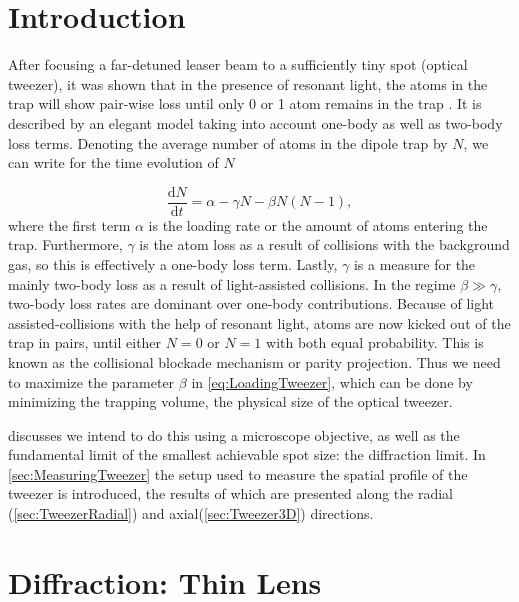 \section{Introduction}\label{sec:LoadingAtoms}

After focusing a far-detuned leaser beam to a sufficiently tiny spot (optical tweezer), it was shown that in the presence of resonant light, the atoms in the trap will show pair-wise loss until only 0 or 1 atom remains in the trap \cite{Schlosser2001}.
It is described by an elegant model taking into account one-body as well as two-body loss terms. 
Denoting the average number of atoms in the dipole trap by $N$, we can write for the time evolution of $N$ \cite{Schlosser2002} 

\begin{equation}\label{eq:LoadingTweezer}
	\frac{\text{d}N}{\text{d}t} = \alpha - \gamma N - \beta N(N-1),
\end{equation}
where the first term $\alpha$ is the loading rate or the amount of atoms entering the trap.
Furthermore, $\gamma$ is the atom loss as a result of collisions with the background gas, so this is effectively a one-body loss term.
Lastly, $\gamma$ is a measure for the mainly two-body loss as a result of light-assisted collisions.
In the regime $\beta \gg \gamma$, two-body loss rates are dominant over one-body contributions. 
Because of light assisted-collisions with the help of resonant light, atoms are now kicked out of the trap in pairs, until either $N=0$ or $N=1$ with both equal probability. 
This is known as the collisional blockade mechanism \cite{Schlosser2001} or parity projection.
Thus we need to maximize the parameter $\beta$ in \cref{eq:LoadingTweezer}, which can be done by minimizing the trapping volume, the physical size of the optical tweezer.

 discusses we intend to do this using a microscope objective, as well as the fundamental limit of the smallest achievable spot size: the diffraction limit.
In \cref{sec:MeasuringTweezer} the setup used to measure the spatial profile of the tweezer is introduced, the results of which are presented along the radial (\cref{sec:TweezerRadial}) and axial(\cref{sec:Tweezer3D}) directions.

\section{Diffraction: Thin Lens}\label{sec:DiffractionLimit}

